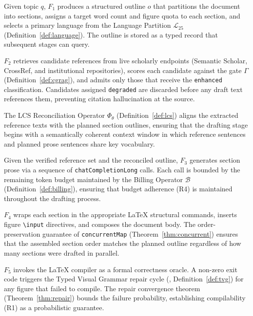 \begin{description}[leftmargin=2.4em, style=nextline]
  \item[$F_1$ — Plan.]
    Given topic $q$, $F_1$ produces a structured outline $o$ that partitions the document
    into sections, assigns a target word count and figure quota to each section, and
    selects a primary language from the Language Partition $\mathcal{L}_{25}$
    (Definition~\ref{def:language}).
    The outline is stored as a typed record that subsequent stages can query.
  \item[$F_2$ — Extract and Verify.]
    $F_2$ retrieves candidate references from live scholarly endpoints (Semantic Scholar,
    CrossRef, and institutional repositories), scores each candidate against the
    \cgrag{} gate $\Gamma$ (Definition~\ref{def:cgrag}), and admits only those that
    receive the \texttt{enhanced} classification.
    Candidates assigned \texttt{degraded} are discarded before any draft text references them,
    preventing citation hallucination at the source.
  \item[$F_{2.5}$ — Reconcile.]
    The LCS Reconciliation Operator $\Phi_\theta$ (Definition~\ref{def:lcs}) aligns the
    extracted reference texts with the planned section outlines, ensuring that the
    drafting stage begins with a semantically coherent context window in which reference
    sentences and planned prose sentences share key vocabulary.
  \item[$F_3$ — Draft.]
    Given the verified reference set and the reconciled outline, $F_3$ generates section
    prose via a sequence of \texttt{chatCompletionLong} calls.
    Each call is bounded by the remaining token budget maintained by the Billing Operator
    $\mathcal{B}$ (Definition~\ref{def:billing}), ensuring that budget adherence (R4)
    is maintained throughout the drafting process.
  \item[$F_4$ — Assemble.]
    $F_4$ wraps each section in the appropriate \LaTeX{} structural commands, inserts figure
    \texttt{\textbackslash input} directives, and composes the document body.
    The order-preservation guarantee of \texttt{concurrentMap} (Theorem~\ref{thm:concurrent})
    ensures that the assembled section order matches the planned outline regardless of
    how many sections were drafted in parallel.
  \item[$F_5$ — Validate.]
    $F_5$ invokes the \LaTeX{} compiler as a formal correctness oracle.
    A non-zero exit code triggers the Typed Visual Grammar repair cycle
    (\tvg{}, Definition~\ref{def:tvg}) for any figure that failed to compile.
    The repair convergence theorem (Theorem~\ref{thm:repair}) bounds the failure
    probability, establishing compilability (R1) as a probabilistic guarantee.
\end{description}


